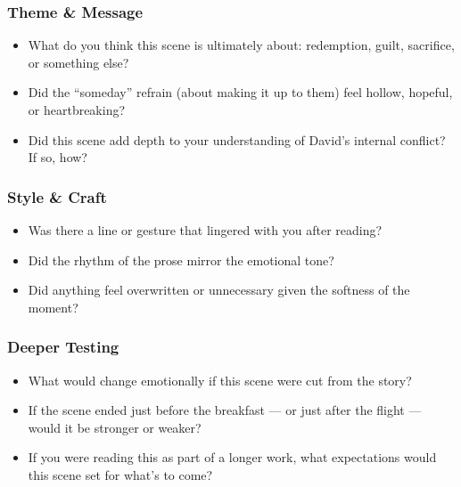 \subsubsection{Theme \& Message}

\begin{itemize}
  \item What do you think this scene is ultimately about: redemption, guilt, sacrifice, or something else?
  \item Did the “someday” refrain (about making it up to them) feel hollow, hopeful, or heartbreaking?
  \item Did this scene add depth to your understanding of David’s internal conflict? If so, how?
\end{itemize}

\subsubsection{Style \& Craft}

\begin{itemize}
  \item Was there a line or gesture that lingered with you after reading?
  \item Did the rhythm of the prose mirror the emotional tone?
  \item Did anything feel overwritten or unnecessary given the softness of the moment?
\end{itemize}

\subsubsection{Deeper Testing}

\begin{itemize}
  \item What would change emotionally if this scene were cut from the story?
  \item If the scene ended just before the breakfast — or just after the flight — would it be stronger or weaker?
  \item If you were reading this as part of a longer work, what expectations would this scene set for what’s to come?
\end{itemize}











